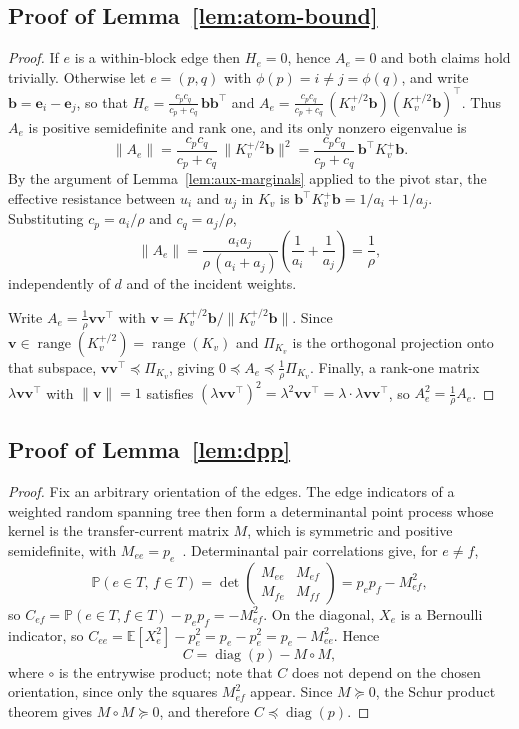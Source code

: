\documentclass{article}
\newcommand{\1}{\mathbbm{1}}
\theoremstyle{plain}
\renewcommand{\Pr}[1]{\mathbb{P}\left(#1\right)}
\begin{document}
\subsection{Proof of Lemma~\ref{lem:atom-bound}}
\label{app:atom_bound}
\begin{proof}
If $e$ is a within-block edge then $H_e=0$, hence $A_e=0$ and both
claims hold trivially. Otherwise let $e=(p,q)$ with
$\phi(p)=i\neq j=\phi(q)$, and write
$\mathbf b=\mathbf e_i-\mathbf e_j$, so that
$H_e=\frac{c_pc_q}{c_p+c_q}\,\mathbf b\mathbf b^\top$ and
$A_e=\frac{c_pc_q}{c_p+c_q}\,(K_v^{+/2}\mathbf b)(K_v^{+/2}\mathbf b)^\top$.
Thus $A_e$ is positive semidefinite and rank one, and its only nonzero
eigenvalue is
\[
\|A_e\|
=\frac{c_pc_q}{c_p+c_q}\,\bigl\|K_v^{+/2}\mathbf b\bigr\|^2
=\frac{c_pc_q}{c_p+c_q}\,\mathbf b^\top K_v^{+}\mathbf b .
\]
By the argument of Lemma~\ref{lem:aux-marginals} applied to the pivot
star, the effective resistance between $u_i$ and $u_j$ in $K_v$ is
$\mathbf b^\top K_v^{+}\mathbf b=1/a_i+1/a_j$. Substituting
$c_p=a_i/\rho$ and $c_q=a_j/\rho$,
\[
\|A_e\|
=\frac{a_ia_j}{\rho\,(a_i+a_j)}
 \left(\frac{1}{a_i}+\frac{1}{a_j}\right)
=\frac{1}{\rho},
\]
independently of $d$ and of the incident weights.

Write $A_e=\frac{1}{\rho}\mathbf v\mathbf v^\top$ with
$\mathbf v=K_v^{+/2}\mathbf b/\|K_v^{+/2}\mathbf b\|$. Since
$\mathbf v\in\operatorname{range}(K_v^{+/2})=\operatorname{range}(K_v)$
and $\Pi_{K_v}$ is the orthogonal projection onto that subspace,
$\mathbf v\mathbf v^\top\preceq\Pi_{K_v}$, giving
$0\preceq A_e\preceq\frac{1}{\rho}\Pi_{K_v}$. Finally, a rank-one
matrix $\lambda\mathbf v\mathbf v^\top$ with $\|\mathbf v\|=1$
satisfies $(\lambda\mathbf v\mathbf v^\top)^2
=\lambda^2\mathbf v\mathbf v^\top=\lambda\cdot
\lambda\mathbf v\mathbf v^\top$, so $A_e^2=\frac{1}{\rho}A_e$.
\end{proof}

\subsection{Proof of Lemma~\ref{lem:dpp}}
\label{app:dpp}
\begin{proof}
Fix an arbitrary orientation of the edges. The edge indicators of a
weighted random spanning tree then form a determinantal point process
whose kernel is the transfer-current matrix $M$, which is symmetric
and positive semidefinite, with
$M_{ee}=p_e$~\cite{lyons2003determinantal}. Determinantal pair
correlations give, for $e\neq f$,
\[
\Pr{e\in T,\,f\in T}
=\det\begin{pmatrix} M_{ee} & M_{ef}\\ M_{fe} & M_{ff}\end{pmatrix}
=p_ep_f-M_{ef}^2 ,
\]
so $C_{ef}=\Pr{e\in T,f\in T}-p_ep_f=-M_{ef}^2$. On the diagonal,
$X_e$ is a Bernoulli indicator, so
$C_{ee}=\mathbb E[X_e^2]-p_e^2=p_e-p_e^2=p_e-M_{ee}^2$. Hence
\[
C=\operatorname{diag}(p)-M\circ M ,
\]
where $\circ$ is the entrywise product; note that $C$ does not depend
on the chosen orientation, since only the squares $M_{ef}^2$ appear.
Since $M\succeq 0$, the Schur product theorem gives
$M\circ M\succeq 0$, and therefore
$C\preceq\operatorname{diag}(p)$.
\end{proof}
\end{document}
